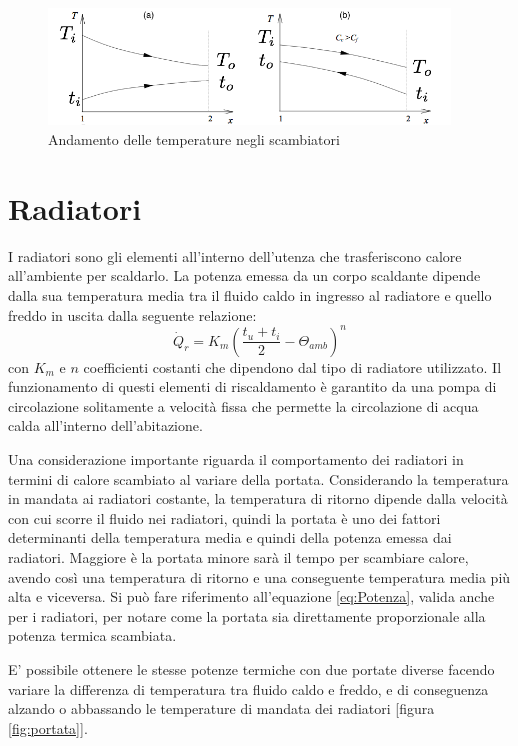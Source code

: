 \documentclass[laurea,oneside,11pt]{USiena_tesiLM}
\begin{document}
\begin{figure}[h]
\begin{center}
\includegraphics[width=0.95\textwidth]{figure/grafico_scambiatore} %
\caption{Andamento delle temperature negli scambiatori }
\label{fig:andamento}
\end{center}
\end{figure}

\section{Radiatori}
I radiatori sono gli elementi all'interno dell'utenza che trasferiscono calore all'ambiente per scaldarlo. 
La potenza emessa da un corpo scaldante dipende dalla sua temperatura media tra il fluido caldo in ingresso al radiatore e quello freddo in uscita dalla seguente relazione:
\begin{equation}
\dot{Q}_r= K_m(\frac{t_u + t_i}{2} - \Theta_{amb})^n
\end{equation}
con $K_m$ e $n$ coefficienti costanti che dipendono dal tipo di radiatore utilizzato. 
Il funzionamento di questi elementi di riscaldamento è garantito da una pompa di circolazione solitamente a velocità fissa che permette la circolazione di acqua calda all'interno dell'abitazione. 

Una considerazione  importante riguarda il comportamento dei radiatori in termini di calore scambiato al variare della portata. Considerando la temperatura in mandata ai radiatori costante, la temperatura di ritorno dipende  dalla velocità con cui scorre il fluido nei radiatori, quindi la portata è uno dei fattori determinanti della temperatura media e quindi della potenza emessa dai radiatori. Maggiore è la portata minore sarà il tempo per scambiare calore, avendo così una temperatura di ritorno e una conseguente temperatura media più alta e viceversa. Si può fare riferimento all'equazione \ref{eq:Potenza}, valida anche per i radiatori, per notare come la portata sia direttamente proporzionale alla potenza termica scambiata. 

E' possibile ottenere  le stesse potenze termiche con due portate diverse facendo variare la differenza di temperatura tra fluido caldo e freddo, e di conseguenza alzando o abbassando le temperature di mandata dei radiatori [figura \ref{fig:portata}]. 
\end{document}
